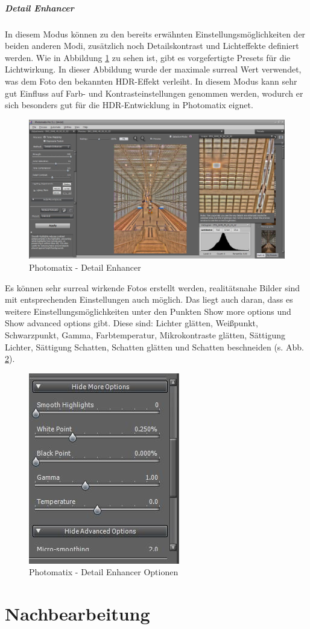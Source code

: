 \documentclass[liststotoc,bibtotoc,fontsize=14pt,]{scrreprt}
\begin{document}
		\paragraph{Detail Enhancer} In diesem Modus können zu den bereits erwähnten Einstellungsmöglichkeiten der beiden anderen Modi, zusätzlich noch Detailskontrast und Lichteffekte definiert werden. Wie in Abbildung \ref{img:photo3} zu sehen ist, gibt es vorgefertigte Presets für die Lichtwirkung. In dieser Abbildung wurde der maximale surreal Wert verwendet, was dem Foto den bekannten HDR-Effekt verleiht.
		In diesem Modus kann sehr gut Einfluss auf Farb- und Kontrasteinstellungen genommen werden, wodurch er sich besonders gut für die HDR-Entwicklung in Photomatix eignet. 
		
		\bigskip
		\begin{figure}[H]
			\includegraphics[width=\linewidth]{img/photo3.jpg}
			\caption{Photomatix - Detail Enhancer}
			\label{img:photo3}
		\end{figure}
	
		Es können sehr surreal wirkende Fotos erstellt werden, realitätsnahe Bilder sind mit entsprechenden Einstellungen auch möglich. Das liegt auch daran, dass es weitere Einstellungsmöglichkeiten unter den Punkten \grqq{}Show more options\grqq{} und \grqq{}Show advanced options\grqq{} gibt. Diese sind: Lichter glätten, Weißpunkt,	Schwarzpunkt, Gamma, Farbtemperatur, Mikrokontraste glätten, Sättigung Lichter, Sättigung Schatten, Schatten glätten und Schatten beschneiden (s. Abb. \ref{img:photo6}).
		
		\bigskip
		\begin{figure}[H]
			\includegraphics[width=.5\linewidth]{img/photo6.jpg}
			\caption{Photomatix - Detail Enhancer Optionen}
			\label{img:photo6}
		\end{figure}
	
	\chapter{Nachbearbeitung}
	\label{ch:nach}
	
	
\end{document}
